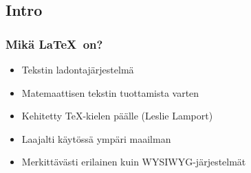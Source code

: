 
\subsection{Intro}
\begin{frame}
    \frametitle{Mikä \LaTeX\  on?}
    \begin{itemize}[<+->]
        \item Tekstin ladontajärjestelmä
        \item Matemaattisen tekstin tuottamista varten
        \item Kehitetty \TeX -kielen päälle (Leslie Lamport)
        \item Laajalti käytössä ympäri maailman
        \item Merkittävästi erilainen kuin WYSIWYG-järjestelmät
    \end{itemize}
\end{frame}


